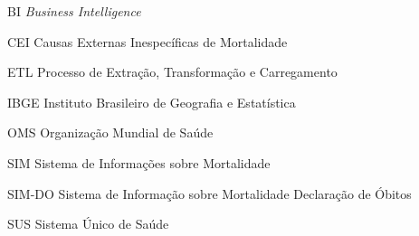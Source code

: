 \begin{siglas}
    
    \item[BI] \textit{Business Intelligence}
    \item[CEI] Causas Externas Inespecíficas de Mortalidade
    \item[ETL] Processo de Extração, Transformação e Carregamento
    \item[IBGE] Instituto Brasileiro de Geografia e Estatística
    \item[OMS] Organização Mundial de Saúde
    \item[SIM] Sistema de Informações sobre Mortalidade
    \item[SIM-DO] Sistema de Informação sobre Mortalidade Declaração de Óbitos
    \item[SUS] Sistema Único de Saúde
    
\end{siglas}
